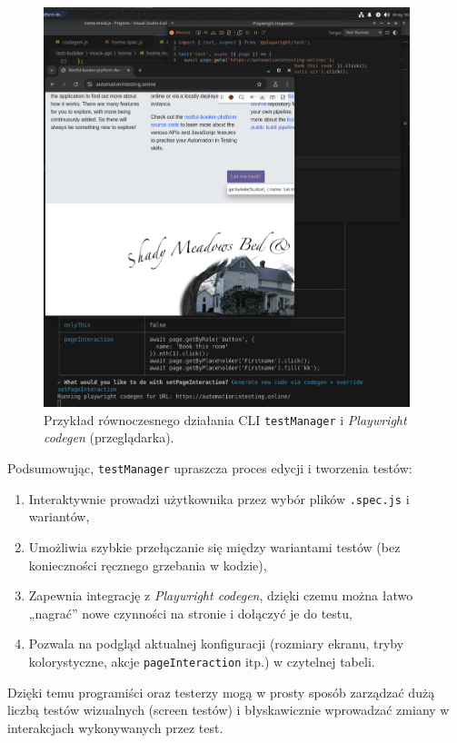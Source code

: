 \documentclass[12pt]{report}
\begin{document}
\begin{figure}[H]
\centering
\includegraphics[width=0.95\textwidth]{tm_code_generation.png}
\caption{Przykład równoczesnego działania CLI \texttt{testManager} i \emph{Playwright codegen} (przeglądarka).}
\label{fig:tm_code_generation}
\end{figure}

\noindent Podsumowując, \texttt{testManager} upraszcza proces edycji i tworzenia testów:
\begin{enumerate}
   \item Interaktywnie prowadzi użytkownika przez wybór plików \texttt{.spec.js} i wariantów,
   \item Umożliwia szybkie przełączanie się między wariantami testów (bez konieczności ręcznego grzebania w kodzie),
   \item Zapewnia integrację z \emph{Playwright codegen}, dzięki czemu można łatwo „nagrać” nowe czynności na stronie i dołączyć je do testu,
   \item Pozwala na podgląd aktualnej konfiguracji (rozmiary ekranu, tryby kolorystyczne, akcje \texttt{pageInteraction} itp.) w czytelnej tabeli.
\end{enumerate}

Dzięki temu programiści oraz testerzy mogą w prosty sposób zarządzać dużą liczbą testów wizualnych (screen testów) i błyskawicznie wprowadzać zmiany w interakcjach wykonywanych przez test.
\end{document}
